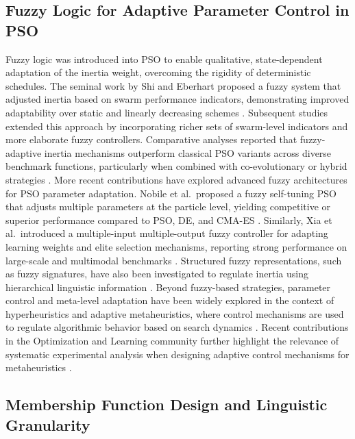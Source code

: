 \documentclass[runningheads]{llncs}
\begin{document}
\subsection{Fuzzy Logic for Adaptive Parameter Control in PSO} Fuzzy logic was introduced into PSO to enable qualitative, state-dependent adaptation of the inertia weight, overcoming the rigidity of deterministic schedules. The seminal work by Shi and Eberhart proposed a fuzzy system that adjusted inertia based on swarm performance indicators, demonstrating improved adaptability over static and linearly decreasing schemes \cite{shi2001fuzzy}. Subsequent studies extended this approach by incorporating richer sets of swarm-level indicators and more elaborate fuzzy controllers. Comparative analyses reported that fuzzy-adaptive inertia mechanisms outperform classical PSO variants across diverse benchmark functions, particularly when combined with co-evolutionary or hybrid strategies \cite{valdez2017comparative,noronha2021diversity}. More recent contributions have explored advanced fuzzy architectures for PSO parameter adaptation. Nobile et al.\ proposed a fuzzy self-tuning PSO that adjusts multiple parameters at the particle level, yielding competitive or superior performance compared to PSO, DE, and CMA-ES \cite{nobile2018fuzzy}. Similarly, Xia et al.\ introduced a multiple-input multiple-output fuzzy controller for adapting learning weights and elite selection mechanisms, reporting strong performance on large-scale and multimodal benchmarks \cite{xia2022particle}. Structured fuzzy representations, such as fuzzy signatures, have also been investigated to regulate inertia using hierarchical linguistic information \cite{komarudin2021signature}. Beyond fuzzy-based strategies, parameter control and meta-level adaptation have been widely explored in the context of hyperheuristics and adaptive metaheuristics, where control mechanisms are used to regulate algorithmic behavior based on search dynamics \cite{crawford2013parameter,talbi2009metaheuristics}. Recent contributions in the Optimization and Learning community further highlight the relevance of systematic experimental analysis when designing adaptive control mechanisms for metaheuristics \cite{abrego2023multi,cisternas2025objective}.


\vspace{-0.25cm}
\subsection{Membership Function Design and Linguistic Granularity}
\end{document}
